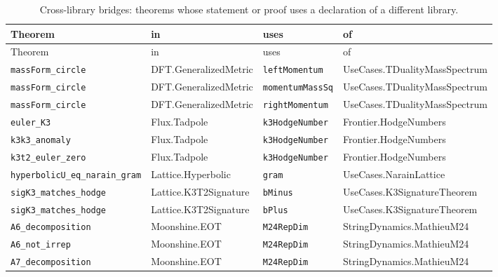 \begin{longtable}{p{}p{}p{}p{}}
\caption{Cross-library bridges: theorems whose statement or proof uses a declaration of a different library.}\label{tab:atlas-bridges}\\
\toprule
Theorem & in & uses & of \\ \midrule \endfirsthead
\toprule
Theorem & in & uses & of \\ \midrule \endhead
\bottomrule \endfoot
\texttt{\small massForm\_circle} & {\scriptsize DFT.GeneralizedMetric} & \texttt{\small leftMomentum} & {\scriptsize UseCases.TDualityMassSpectrum} \\
\texttt{\small massForm\_circle} & {\scriptsize DFT.GeneralizedMetric} & \texttt{\small momentumMassSq} & {\scriptsize UseCases.TDualityMassSpectrum} \\
\texttt{\small massForm\_circle} & {\scriptsize DFT.GeneralizedMetric} & \texttt{\small rightMomentum} & {\scriptsize UseCases.TDualityMassSpectrum} \\
\texttt{\small euler\_K3} & {\scriptsize Flux.Tadpole} & \texttt{\small k3HodgeNumber} & {\scriptsize Frontier.HodgeNumbers} \\
\texttt{\small k3k3\_anomaly} & {\scriptsize Flux.Tadpole} & \texttt{\small k3HodgeNumber} & {\scriptsize Frontier.HodgeNumbers} \\
\texttt{\small k3t2\_euler\_zero} & {\scriptsize Flux.Tadpole} & \texttt{\small k3HodgeNumber} & {\scriptsize Frontier.HodgeNumbers} \\
\texttt{\small hyperbolicU\_eq\_narain\_gram} & {\scriptsize Lattice.Hyperbolic} & \texttt{\small gram} & {\scriptsize UseCases.NarainLattice} \\
\texttt{\small sigK3\_matches\_hodge} & {\scriptsize Lattice.K3T2Signature} & \texttt{\small bMinus} & {\scriptsize UseCases.K3SignatureTheorem} \\
\texttt{\small sigK3\_matches\_hodge} & {\scriptsize Lattice.K3T2Signature} & \texttt{\small bPlus} & {\scriptsize UseCases.K3SignatureTheorem} \\
\texttt{\small A6\_decomposition} & {\scriptsize Moonshine.EOT} & \texttt{\small M24RepDim} & {\scriptsize StringDynamics.MathieuM24} \\
\texttt{\small A6\_not\_irrep} & {\scriptsize Moonshine.EOT} & \texttt{\small M24RepDim} & {\scriptsize StringDynamics.MathieuM24} \\
\texttt{\small A7\_decomposition} & {\scriptsize Moonshine.EOT} & \texttt{\small M24RepDim} & {\scriptsize StringDynamics.MathieuM24} \\

\end{longtable}

